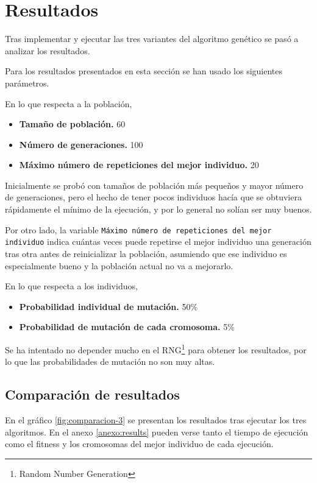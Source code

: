 \chapter{Resultados}
\label{chap:res}

Tras implementar y ejecutar las tres variantes del algoritmo genético se pasó a analizar los resultados.

Para los resultados presentados en esta sección se han usado los siguientes parámetros.

En lo que respecta a la población,

\begin{itemize}
	\item \textbf{Tamaño de población.} 60
	\item \textbf{Número de generaciones.} 100
	\item \textbf{Máximo número de repeticiones del mejor individuo.} 20
\end{itemize}

Inicialmente se probó con tamaños de población más pequeños y mayor número de generaciones, pero el hecho de tener pocos individuos hacía que se obtuviera rápidamente el mínimo de la ejecución, y por lo general no solían ser muy buenos.

Por otro lado, la variable \texttt{Máximo número de repeticiones del mejor individuo} indica cuántas veces puede repetirse el mejor individuo una generación tras otra antes de reinicializar la población, asumiendo que ese individuo es especialmente bueno y la población actual no va a mejorarlo.

En lo que respecta a los individuos,

\begin{itemize}
	\item \textbf{Probabilidad individual de mutación.} 50\%
	\item \textbf{Probabilidad de mutación de cada cromosoma.} 5\%
\end{itemize}

Se ha intentado no depender mucho en el RNG\footnote{Random Number Generation} para obtener los resultados, por lo que las probabilidades de mutación no son muy altas.

\section{Comparación de resultados}

En el gráfico \ref{fig:comparacion-3} se presentan los resultados tras ejecutar los tres algoritmos. En el anexo \ref{anexo:results} pueden verse tanto el tiempo de ejecución como el fitness y los cromosomas del mejor individuo de cada ejecución.

